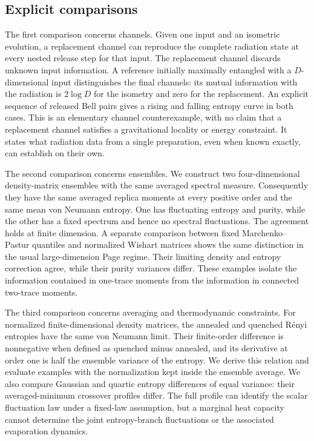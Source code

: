 \documentclass[11pt,letterpaper]{article}
\theoremstyle{plain}
\theoremstyle{definition}
\theoremstyle{remark}
\begin{document}
\subsection{Explicit comparisons}

The first comparison concerns channels. Given one input and an
isometric evolution, a replacement channel can reproduce the complete
radiation state at every nested release step for that input. The
replacement channel discards unknown input information. A reference
initially maximally entangled with a $D$-dimensional input distinguishes
the final channels: its mutual information with the radiation is
$2\log D$ for the isometry and zero for the replacement. An explicit
sequence of released Bell pairs gives a rising and falling entropy
curve in both cases. This is an elementary channel counterexample,
with no claim that a replacement channel satisfies a gravitational
locality or energy constraint. It states what radiation data from a
single preparation, even when known exactly, can establish on their own.

The second comparison concerns ensembles. We construct two
four-dimensional density-matrix ensembles with the same averaged
spectral measure. Consequently they have the same averaged replica
moments at every positive order and the same mean von Neumann entropy.
One has fluctuating entropy and purity, while the other has a fixed
spectrum and hence no spectral fluctuations. The agreement holds at
finite dimension. A separate comparison between fixed
Marchenko--Pastur quantiles and normalized Wishart matrices shows the
same distinction in the usual large-dimension Page regime. Their
limiting density and entropy correction agree, while their purity
variances differ. These examples isolate the information contained in
one-trace moments from the information in connected two-trace moments.

The third comparison concerns averaging and thermodynamic constraints.
For normalized finite-dimensional density matrices, the annealed and
quenched R\'enyi entropies have the same von Neumann limit. Their
finite-order difference is nonnegative when defined as quenched minus
annealed, and its derivative at order one is half the ensemble variance
of the entropy. We derive this relation and evaluate examples with the
normalization kept inside the ensemble average. We also compare
Gaussian and quartic entropy differences of equal variance: their
averaged-minimum crossover profiles differ. The full profile can
identify the scalar fluctuation law under a fixed-law assumption, but
a marginal heat capacity cannot determine the joint entropy-branch
fluctuations or the associated evaporation dynamics.
\end{document}
